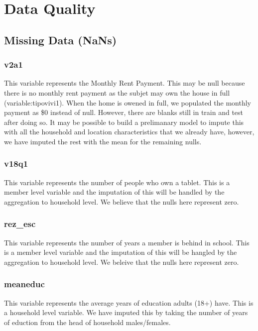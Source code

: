 \documentclass[11pt]{article}
\begin{document}
    \section{Data Quality}\label{data-quality}

\subsection{Missing Data (NaNs)}\label{missing-data-nans}

\subsubsection{v2a1}\label{v2a1}

This variable represents the Monthly Rent Payment. This may be null
because there is no monthly rent payment as the subjet may own the house
in full (variable:tipovivi1). When the home is owened in full, we
populated the monthly payment as \$0 instead of null. However, there are
blanks still in train and test after doing so. It may be possible to
build a prelimanary model to impute this with all the household and
location characteristics that we already have, however, we have imputed
the rest with the mean for the remaining nulls.

\subsubsection{v18q1}\label{v18q1}

This variable represents the number of people who own a tablet. This is
a member level variable and the imputation of this will be handled by
the aggregation to household level. We believe that the nulls here
represent zero.

\subsubsection{rez\_esc}\label{rez_esc}

This variable represents the number of years a member is behind in
school. This is a member level variable and the imputation of this will
be hangled by the aggregation to household level. We beleive that the
nulls here represent zero.

\subsubsection{meaneduc}\label{meaneduc}

This variable represents the average years of education adults (18+)
have. This is a household level variable. We have imputed this by taking
the number of years of eduction from the head of household
males/females.
\end{document}
